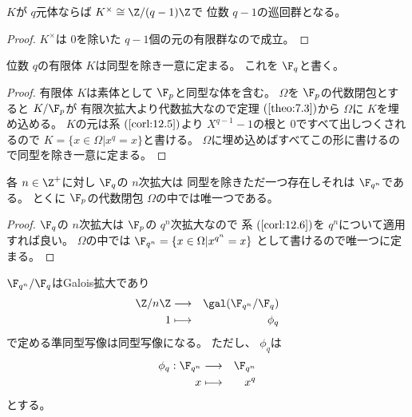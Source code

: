 \documentclass[../master_galois_theory]{subfiles}
\begin{document}
\begin{corl} \label{corl:12.5}
  $K$が $q$元体ならば $K^\times \cong \Z/(q-1)\Z$で
  位数 $q - 1$の巡回群となる。
\end{corl}

\begin{proof}
  $K^\times$は $0$を除いた $q-1$個の元の有限群なので成立。
\end{proof}

\begin{corl} \label{corl:12.6}
  位数 $q$の有限体 $K$は同型を除き一意に定まる。
  これを $\F_q$と書く。
\end{corl}

\begin{proof}
  有限体 $K$は素体として $\F_p$と同型な体を含む。
  $\Omega$を $\F_p$の代数閉包とすると $K/\F_p$が
  有限次拡大より代数拡大なので定理 $(\mathrm{\ref{theo:7.3}})$から
  $\Omega$に $K$を埋め込める。
  $K$の元は系 $(\mathrm{\ref{corl:12.5}})$より $X^{q-1} - 1$の根と $0$ですべて出しつくされるので
  $K = \{ x \in \Omega | x^{q} = x \}$と書ける。
  $\Omega$に埋め込めばすべてこの形に書けるので同型を除き一意に定まる。
\end{proof}

\begin{corl} \label{corl:12.7}
  各 $n \in \Z^+$に対し $\F_q$の $n$次拡大は
  同型を除きただ一つ存在しそれは $\F_{q^n}$である。
  とくに $\F_p$の代数閉包 $\Omega$の中では唯一つである。
\end{corl}

\begin{proof}
  $\F_q$の $n$次拡大は $\F_p$の $q^n$次拡大なので
  系 $(\mathrm{\ref{corl:12.6}})$を $q^n$について適用すれば良い。
  $\Omega$の中では $\F_{q^n} = \{ x \in \Omega | x^{q^n} = x \}$
  として書けるので唯一つに定まる。
\end{proof}

\begin{prop} \label{prop:finitegalois}
  $\F_{q^n}/\F_q$は\rm{Galois}拡大であり
  \begin{eqnarray*}
    \Z/n \Z & \longrightarrow & \gal(\F_{q^n}/\F_q) \\
    1 & \longmapsto & \phi_q
  \end{eqnarray*}
  で定める準同型写像は同型写像になる。
  ただし、 $\phi_q$は
  \begin{eqnarray*}
    \phi_q : \F_{q^n} & \longrightarrow & \F_{q^n} \\
    x & \longmapsto & x^q
  \end{eqnarray*}
  とする。
\end{prop}
\end{document}

